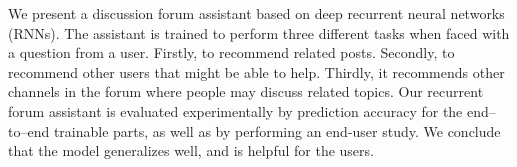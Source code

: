 We present a discussion forum assistant based on deep recurrent  neural networks (RNNs). The assistant is trained to perform three different tasks when faced with a question from a user. Firstly, to recommend related posts. Secondly, to recommend other users that might be able to help. Thirdly, it recommends other channels in the forum where people may discuss related topics. Our recurrent forum assistant is evaluated experimentally by prediction accuracy for the end--to--end trainable parts, as well as by performing an end-user study. We conclude that the model generalizes well, and is helpful for the users.
